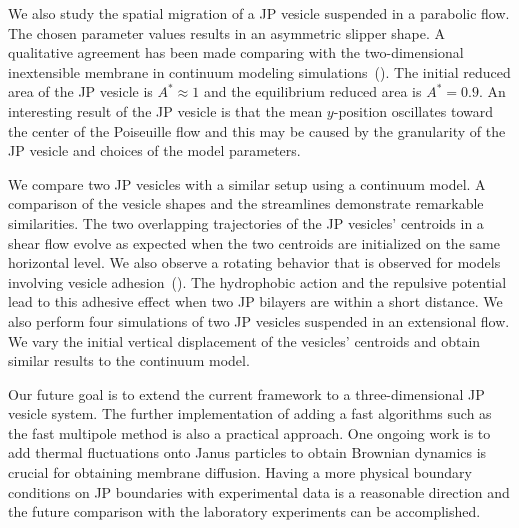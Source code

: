 \documentclass[lineno]{jfm}
\begin{document}
We also study the spatial migration of a JP vesicle suspended in a
parabolic flow. The chosen parameter values results in an asymmetric
slipper shape. A qualitative agreement has been made comparing with the
two-dimensional inextensible membrane in continuum modeling
simulations~(\cite{Kaoui09, dan-vla-mis2009, cou-kao-pod-mis2008}). The
initial reduced area of the JP vesicle is $A^* \approx 1$ and the
equilibrium reduced area is $A^*=0.9$. An interesting result of the JP
vesicle is that the mean $y$-position oscillates toward the center of
the Poiseuille flow and this may be caused by the granularity of the JP
vesicle and choices of the model parameters.

We compare two JP vesicles with a similar setup using a continuum model.
A comparison of the vesicle shapes and the streamlines demonstrate
remarkable similarities. The two overlapping trajectories of the JP
vesicles' centroids in a shear flow evolve as expected when the two
centroids are initialized on the same horizontal level. We also observe
a rotating behavior that is observed for models involving vesicle
adhesion~(\cite{qua-vee-you2019}). The hydrophobic action and the
repulsive potential lead to this adhesive effect when two JP bilayers
are within a short distance. We also perform four simulations of two JP
vesicles suspended in an extensional flow. We vary the initial vertical
displacement of the vesicles' centroids and obtain similar results to
the continuum model.

Our future goal is to extend the current framework to a
three-dimensional JP vesicle system. The further implementation of
adding a fast algorithms such as the fast multipole method is also a
practical approach. One ongoing work is to add thermal fluctuations onto
Janus particles to obtain Brownian dynamics is crucial for obtaining
membrane diffusion. Having a more physical boundary conditions on JP
boundaries with experimental data is a reasonable direction and the
future comparison with the laboratory experiments can be accomplished.



\begin{acknowledgments}
\end{acknowledgments}

%
\end{document}

